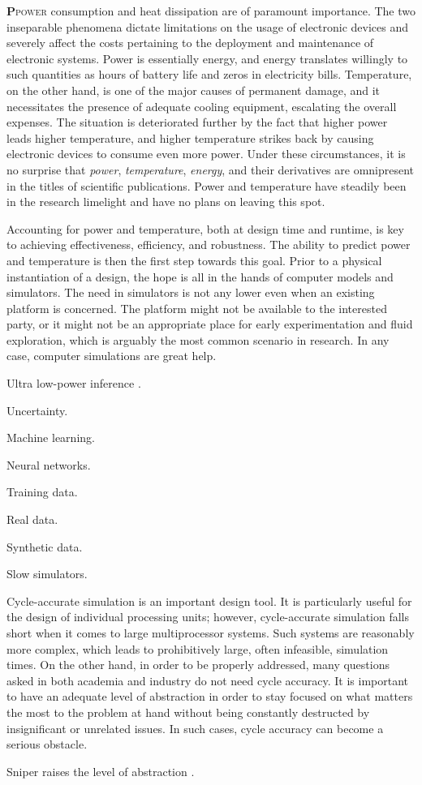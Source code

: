 \lettrine[findent=0.4em, nindent=0em]{\textbf{P}}{power} consumption and heat
dissipation are of paramount importance. The two inseparable phenomena dictate
limitations on the usage of electronic devices and severely affect the costs
pertaining to the deployment and maintenance of electronic systems. Power is
essentially energy, and energy translates willingly to such quantities as hours
of battery life and zeros in electricity bills. Temperature, on the other hand,
is one of the major causes of permanent damage, and it necessitates the presence
of adequate cooling equipment, escalating the overall expenses. The situation is
deteriorated further by the fact that higher power leads higher temperature, and
higher temperature strikes back by causing electronic devices to consume even
more power. Under these circumstances, it is no surprise that \emph{power},
\emph{temperature}, \emph{energy}, and their derivatives are omnipresent in the
titles of scientific publications. Power and temperature have steadily been in
the research limelight and have no plans on leaving this spot.

Accounting for power and temperature, both at design time and runtime, is key to
achieving effectiveness, efficiency, and robustness. The ability to predict
power and temperature is then the first step towards this goal. Prior to a
physical instantiation of a design, the hope is all in the hands of computer
models and simulators. The need in simulators is not any lower even when an
existing platform is concerned. The platform might not be available to the
interested party, or it might not be an appropriate place for early
experimentation and fluid exploration, which is arguably the most common
scenario in research. In any case, computer simulations are great help.

Ultra low-power inference \cite{park2015}.

Uncertainty.

Machine learning.

Neural networks.

Training data.

Real data.

Synthetic data.

Slow simulators.

Cycle-accurate simulation is an important design tool. It is particularly useful
for the design of individual processing units; however, cycle-accurate
simulation falls short when it comes to large multiprocessor systems. Such
systems are reasonably more complex, which leads to prohibitively large, often
infeasible, simulation times. On the other hand, in order to be properly
addressed, many questions asked in both academia and industry do not need cycle
accuracy. It is important to have an adequate level of abstraction in order to
stay focused on what matters the most to the problem at hand without being
constantly destructed by insignificant or unrelated issues. In such cases, cycle
accuracy can become a serious obstacle.

Sniper raises the level of abstraction \cite{carlson2011}.
